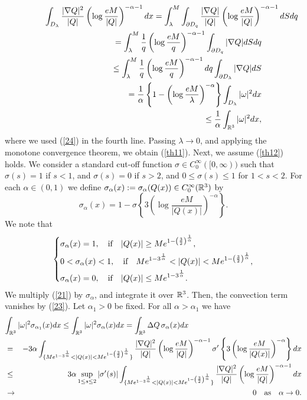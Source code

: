 \documentclass[12pt]{article}
\numberwithin{equation}{section}
\theoremstyle{definition}
\begin{document}
\begin{eqnarray*}
\lefteqn{\int_{D_{\lambda}}\frac{|\nabla Q|^2}{|Q|} \left( \log \frac{eM }{|Q|}\right)^{-{\alpha}-1}  dx=\int_{\lambda} ^M \int_{\partial D_q } \frac{|\nabla Q|}{|Q|} \left( \log \frac{eM }{|Q|}\right)^{-{\alpha}-1} dS dq}\hspace{1.in}{\nonumber} \\
&&=\int_{\lambda} ^M\frac{1}{q} \left( \log \frac{eM }{q}\right)^{-{\alpha}-1} \int_{\partial D_q} |\nabla Q| dS dq{\nonumber} \\
&&\leq \int_{\lambda} ^M\frac{1}{q} \left( \log \frac{eM }{q}\right)^{-{\alpha}-1} dq \int_{\partial D_{\lambda}} |\nabla Q| dS {\nonumber} \\
&&=\frac{1}{\alpha}\left\{1- \left( \log \frac{eM }{\lambda}\right)^{-{\alpha}}\right\} \int_{D_{\lambda}} |{\omega}|^2 dx{\nonumber} \\
&&\leq \frac{1}{\alpha} \int_{\Bbb R^3} |{\omega}|^2 dx,\end{eqnarray*}
where we used (\ref{24}) in the fourth line.
Passing ${\lambda} \to 0$, and applying the monotone convergence theorem, we obtain (\ref{th11}).
Next, we assume (\ref{th12}) holds.
We consider  a standard cut-off function $\sigma\in C_0
^\infty([0, \infty))$ such that $ \sigma(s)=1$ if $s<1$, and ${\sigma}(s)=0$ if $s>2$, 
and $0\leq \sigma  (s)\leq 1$ for $1<s<2$. 
For each ${\alpha} \in (0, 1)$  we  define ${\sigma}_{\alpha}(x):={\sigma}_{\alpha} (Q(x))\in C_0 ^\infty (\Bbb R^3)$ by
$$
{\sigma}_{\alpha} (x)= 1-{\sigma} \left\{  3\left(\log \frac{eM}{|Q(x)|} \right)^{-{\alpha}} \right\}.
$$
We note that
$$
\left\{ \aligned & {\sigma}_{\alpha} (x)=1,  \quad \mbox{if}\quad   |Q(x)|\geq  Me^{1- \left(\frac32\right)^{\frac{1}{\alpha}} }  ,\\
 &0<{\sigma}_{\alpha} (x)<1,  \quad \mbox{if}\quad Me^{1-3 ^{\frac{1}{\alpha}}}< |Q(x)| <Me^{1- \left(\frac32\right)^{\frac{1}{\alpha}} } ,\\
 & {\sigma} _{\alpha}(x)=0,\quad \mbox{if}\quad   |Q(x)| \leq Me^{1-3 ^{\frac{1}{\alpha}}}.\endaligned \right.
 $$
We multiply (\ref{21}) by ${\sigma}_{\alpha}$, and integrate it over $\Bbb R^3$.  Then, the convection term vanishes by (\ref{23}).
Let ${\alpha}_1 >0$ be fixed. For all ${\alpha} >{\alpha}_1$ we have 
\begin{eqnarray*}
\lefteqn{ \int_{\Bbb R^3} |{\omega}|^2 {\sigma}_{{\alpha}_1} (x)dx\leq \int_{\Bbb R^3} |{\omega}|^2 {\sigma}_{\alpha} (x)dx=
 \int_{\Bbb R^3} \Delta Q\, {\sigma}_{\alpha} (x) dx}{\nonumber} \\
&=& -3{\alpha} \int_{\{ Me^{1-3 ^{\frac{1}{\alpha}}}< |Q(x)| <Me^{1- \left(\frac32\right)^{\frac{1}{\alpha}} }\}  } \frac{|\nabla Q|^2}{|Q|} \left( \log \frac{eM}{|Q|} 
\right)^{-{\alpha} -1} {\sigma}' \left\{ 3\left( \log \frac{eM}{|Q(x)|} \right)^{-{\alpha}}\right\} dx{\nonumber} \\
&\leq& 3{\alpha} \sup_{1\leq s\leq 2} |{\sigma}'(s)| \int_{\{  Me^{1-3 ^{\frac{1}{\alpha}}}< |Q(x)| <Me^{1- \left(\frac32\right)^{\frac{1}{\alpha}} }  \}} \frac{|\nabla Q|^2}{|Q|} \left( \log \frac{eM}{|Q|} \right)^{-{\alpha} -1}  dx{\nonumber} \\
&\to &0 \quad \mbox{as}\quad {\alpha}\to 0.
\end{eqnarray*}
\end{document}
